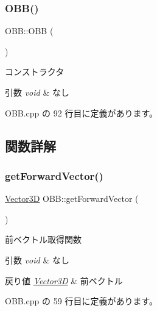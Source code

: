 \subsubsection{\texorpdfstring{O\+B\+B()}{OBB()}}
{\footnotesize\ttfamily O\+B\+B\+::\+O\+BB (\begin{DoxyParamCaption}{ }\end{DoxyParamCaption})}



コンストラクタ 


\begin{DoxyParams}{引数}
{\em void} & なし \\
\hline
\end{DoxyParams}


 O\+B\+B.\+cpp の 92 行目に定義があります。



\subsection{関数詳解}
\mbox{\label{class_o_b_b_a4d839b676caebf6ba4361bb9166e97d3}} 
\subsubsection{\texorpdfstring{get\+Forward\+Vector()}{getForwardVector()}}
{\footnotesize\ttfamily \mbox{\hyperlink{class_vector3_d}{Vector3D}} O\+B\+B\+::get\+Forward\+Vector (\begin{DoxyParamCaption}{ }\end{DoxyParamCaption})}



前ベクトル取得関数 


\begin{DoxyParams}{引数}
{\em void} & なし \\
\hline
\end{DoxyParams}

\begin{DoxyRetVals}{戻り値}
{\em \mbox{\hyperlink{class_vector3_d}{Vector3D}}} & 前ベクトル \\
\hline
\end{DoxyRetVals}


 O\+B\+B.\+cpp の 59 行目に定義があります。

\mbox{\label{class_o_b_b_a00b6038bdcc374d3acd9ef4d002b59d0}} 
